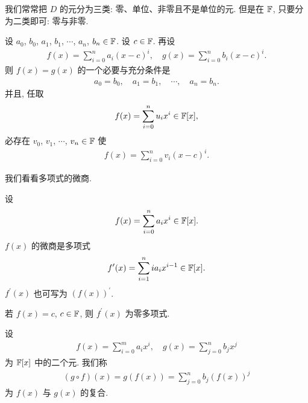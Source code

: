 \begin{remark}
    我们常常把 $D$ 的元分为三类: 零、单位、非零且不是单位的元. 但是在 $\mathbb{F}$, 只要分为二类即可: 零与非零.
\end{remark}

\begin{proposition}
    设 $a_0$, $b_0$, $a_1$, $b_1$, $\cdots$, $a_n$, $b_n \in \mathbb{F}$. 设 $c \in \mathbb{F}$. 再设
    \begin{align*}
        f(x) = \sum_{i = 0}^n a_i (x-c)^i, \quad g(x) = \sum_{i = 0}^n b_i (x-c)^i.
    \end{align*}
    则 $f(x)=g(x)$ 的一个必要与充分条件是
    \begin{align*}
        a_0 = b_0, \quad a_1 = b_1, \quad \cdots, \quad a_n = b_n.
    \end{align*}
    并且, 任取
    \begin{align*}
        f(x) = \sum_{i = 0}^n u_i x^i \in \mathbb{F}[x],
    \end{align*}
    必存在 $v_0$, $v_1$, $\cdots$, $v_n \in \mathbb{F}$ 使
    \begin{align*}
        f(x) = \sum_{i = 0}^n v_i (x-c)^i.
    \end{align*}
\end{proposition}

我们看看多项式的微商.

\begin{definition}
    设
    \begin{align*}
        f(x) = \sum_{i = 0}^{n} a_i x^i \in \mathbb{F}[x].
    \end{align*}
    $f(x)$ 的微商是多项式
    \begin{align*}
        f^{\prime}(x) = \sum_{i = 1}^{n} i a_i x^{i - 1} \in \mathbb{F}[x].
    \end{align*}
    $f^{\prime} (x)$ 也可写为 $(f(x))^{\prime}$.
\end{definition}

\begin{remark}
    若 $f(x) = c$, $c \in \mathbb{F}$, 则 $f^{\prime} (x)$ 为零多项式.
\end{remark}

\begin{definition}
    设
    \begin{align*}
        f(x) = \sum_{i = 0}^{m} a_i x^i, \quad g(x) = \sum_{j = 0}^{n} b_j x^j
    \end{align*}
    为 $\mathbb{F}[x]$ 中的二个元. 我们称
    \begin{align*}
        (g \circ f)(x) = g(f(x)) = \sum_{j = 0}^{n} b_j (f(x))^j
    \end{align*}
    为 $f(x)$ 与 $g(x)$ 的复合.
\end{definition}

